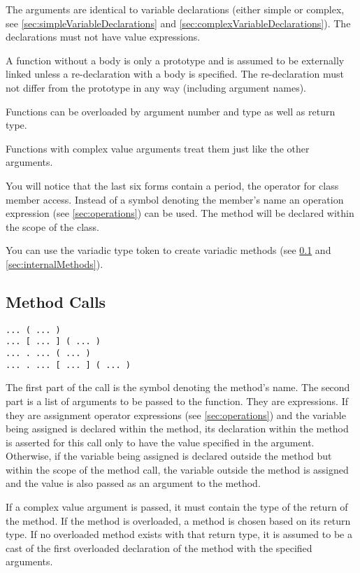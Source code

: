 \documentclass[10pt,a4paper]{article}
\begin{document}
The arguments are identical to variable declarations (either simple or complex, see \ref{sec:simpleVariableDeclarations} and \ref{sec:complexVariableDeclarations}). The declarations must not have value expressions.

A function without a body is only a prototype and is assumed to be externally linked unless a re-declaration with a body is specified. The re-declaration must not differ from the prototype in any way (including argument names).

Functions can be overloaded by argument number and type as well as return type.

Functions with complex value arguments treat them just like the other arguments.

You will notice that the last six forms contain a period, the operator for class member access. Instead of a symbol denoting the member's name an operation expression (see \ref{sec:operations}) can be used. The method will be declared within the scope of the class.

You can use the variadic type token to create variadic methods (see \ref{sec:methodCalls} and \ref{sec:internalMethods}).

\subsection{Method Calls}
\label{sec:methodCalls}
\begin{verbatim}
... ( ... )
... [ ... ] ( ... )
... . ... ( ... )
... . ... [ ... ] ( ... )
\end{verbatim}

The first part of the call is the symbol denoting the method's name. The second part is a list of arguments to be passed to the function. They are expressions. If they are assignment operator expressions (see \ref{sec:operations}) and the variable being assigned is declared within the method, its declaration within the method is asserted for this call only to have the value specified in the argument. Otherwise, if the variable being assigned is declared outside the method but within the scope of the method call, the variable outside the method is assigned and the value is also passed as an argument to the method.

If a complex value argument is passed, it must contain the type of the return of the method. If the method is overloaded, a method is chosen based on its return type. If no overloaded method exists with that return type, it is assumed to be a cast of the first overloaded declaration of the method with the specified arguments.
\end{document}
